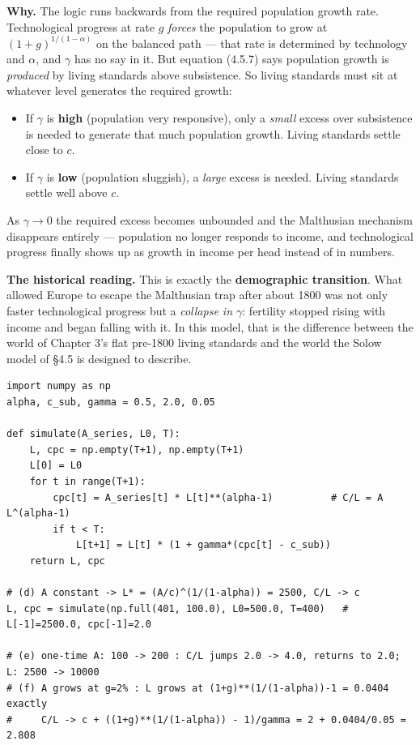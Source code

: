 \documentclass[12pt, letterpaper]{article}
\begin{document}
\begin{tcolorbox}[oddbox,title={Problem 4.5 \quad A Malthusian Model}]
\begin{enumerate}
\textbf{Why.} The logic runs backwards from the required population growth rate.
Technological progress at rate $g$ \emph{forces} the population to grow at
$(1+g)^{1/(1-\alpha)}$ on the balanced path --- that rate is determined by technology and
$\alpha$, and $\gamma$ has no say in it. But equation (4.5.7) says population growth is
\emph{produced} by living standards above subsistence. So living standards must sit at
whatever level generates the required growth:
\begin{itemize}[leftmargin=1.3em,itemsep=3pt,topsep=2pt]
\item If $\gamma$ is \textbf{high} (population very responsive), only a \emph{small} excess
      over subsistence is needed to generate that much population growth. Living standards
      settle close to $c$.
\item If $\gamma$ is \textbf{low} (population sluggish), a \emph{large} excess is needed.
      Living standards settle well above $c$.
\end{itemize}
As $\gamma \to 0$ the required excess becomes unbounded and the Malthusian mechanism
disappears entirely --- population no longer responds to income, and technological progress
finally shows up as growth in income per head instead of in numbers.

\textbf{The historical reading.} This is exactly the \textbf{demographic transition}. What
allowed Europe to escape the Malthusian trap after about 1800 was not only faster
technological progress but a \emph{collapse in $\gamma$}: fertility stopped rising with
income and began falling with it. In this model, that is the difference between the world of
Chapter 3's flat pre-1800 living standards and the world the Solow model of \S4.5 is designed
to describe.

\end{enumerate}

\begin{tcolorbox}[theorybox,title={Verification code (executed)}]
\footnotesize
\begin{verbatim}
import numpy as np
alpha, c_sub, gamma = 0.5, 2.0, 0.05

def simulate(A_series, L0, T):
    L, cpc = np.empty(T+1), np.empty(T+1)
    L[0] = L0
    for t in range(T+1):
        cpc[t] = A_series[t] * L[t]**(alpha-1)          # C/L = A L^(alpha-1)
        if t < T:
            L[t+1] = L[t] * (1 + gamma*(cpc[t] - c_sub))
    return L, cpc

# (d) A constant -> L* = (A/c)^(1/(1-alpha)) = 2500, C/L -> c
L, cpc = simulate(np.full(401, 100.0), L0=500.0, T=400)   # L[-1]=2500.0, cpc[-1]=2.0

# (e) one-time A: 100 -> 200 : C/L jumps 2.0 -> 4.0, returns to 2.0; L: 2500 -> 10000
# (f) A grows at g=2% : L grows at (1+g)**(1/(1-alpha))-1 = 0.0404 exactly
#     C/L -> c + ((1+g)**(1/(1-alpha)) - 1)/gamma = 2 + 0.0404/0.05 = 2.808
\end{verbatim}
\end{tcolorbox}
\end{tcolorbox}
\end{document}
